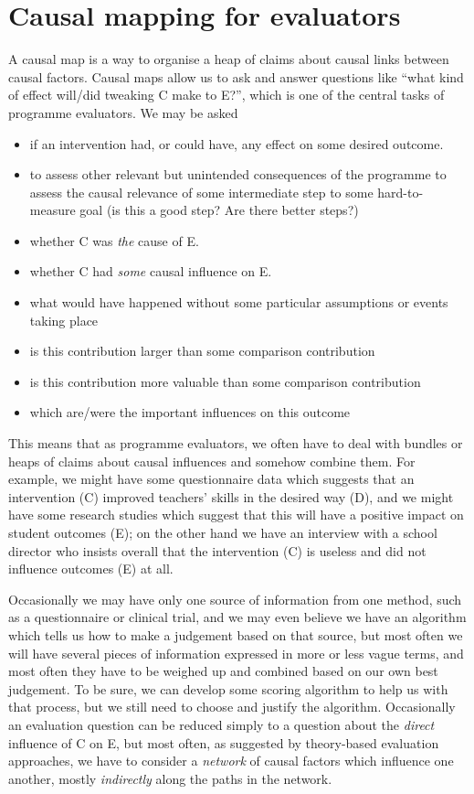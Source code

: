 \documentclass[
]{book}
\begin{document}
\hypertarget{causal-mapping-for-evaluators}{%
\section{Causal mapping for evaluators}\label{causal-mapping-for-evaluators}}

A causal map is a way to organise a heap of claims about causal links between causal factors. Causal maps allow us to ask and answer questions like ``what kind of effect will/did tweaking C make to E?'', which is one of the central tasks of programme evaluators. We may be asked

\begin{itemize}
\item
  if an intervention had, or could have, any effect on some desired outcome.
\item
  to assess other relevant but unintended consequences of the programme to assess the causal relevance of some intermediate step to some hard-to-measure goal (is this a good step? Are there better steps?)
\item
  whether C was \emph{the} cause of E.
\item
  whether C had \emph{some} causal influence on E.
\item
  what would have happened without some particular assumptions or events taking place
\item
  is this contribution larger than some comparison contribution
\item
  is this contribution more valuable than some comparison contribution
\item
  which are/were the important influences on this outcome
\end{itemize}

This means that as programme evaluators, we often have to deal with bundles or heaps of claims about causal influences and somehow combine them. For example, we might have some questionnaire data which suggests that an intervention (C) improved teachers' skills in the desired way (D), and we might have some research studies which suggest that this will have a positive impact on student outcomes (E); on the other hand we have an interview with a school director who insists overall that the intervention (C) is useless and did not influence outcomes (E) at all.

Occasionally we may have only one source of information from one method, such as a questionnaire or clinical trial, and we may even believe we have an algorithm which tells us how to make a judgement based on that source, but most often we will have several pieces of information expressed in more or less vague terms, and most often they have to be weighed up and combined based on our own best judgement. To be sure, we can develop some scoring algorithm to help us with that process, but we still need to choose and justify the algorithm. Occasionally an evaluation question can be reduced simply to a question about the \emph{direct} influence of C on E, but most often, as suggested by theory-based evaluation approaches, we have to consider a \emph{network} of causal factors which influence one another, mostly \emph{indirectly} along the paths in the network.
\end{document}
